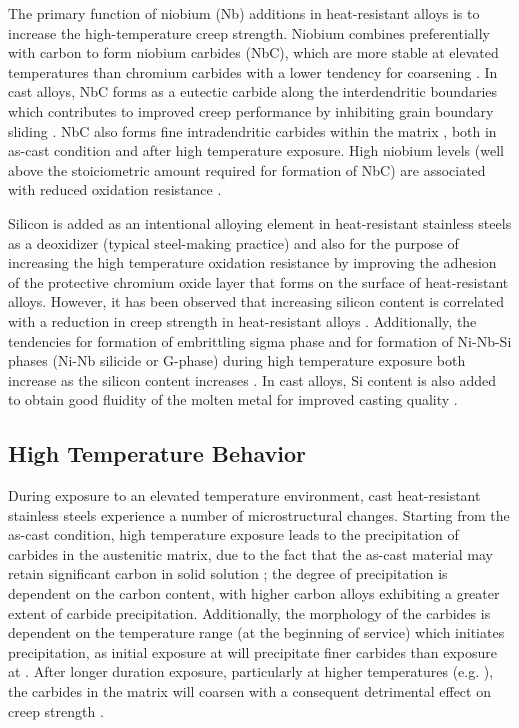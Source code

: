 The primary function of niobium (Nb) additions in heat-resistant alloys is to increase the high-temperature creep strength. Niobium combines preferentially with carbon to form niobium carbides (NbC), which are more stable at elevated temperatures than chromium carbides with a lower tendency for coarsening \cite{keown_niobium_1981}. In cast alloys, NbC forms as a eutectic carbide along the interdendritic boundaries \cite{davis_metallurgy_1994} which contributes to improved creep performance by inhibiting grain boundary sliding \cite{de_almeida_soares_niobium_1992-1}. NbC also forms fine intradendritic carbides within the matrix \cite{chen_characterisation_2004}, both in as-cast condition and after high temperature exposure. High niobium levels (well above the stoiciometric amount required for formation of NbC) are associated with reduced oxidation resistance \cite{collins_effect_1980}.

Silicon is added as an intentional alloying element in heat-resistant stainless steels as a deoxidizer (typical steel-making practice) and also for the purpose of increasing the high temperature oxidation resistance \cite{kane_evolution_1991} by improving the adhesion of the protective chromium oxide layer that forms on the surface of heat-resistant alloys. However, it has been observed that increasing silicon content is correlated with a reduction in creep strength in heat-resistant alloys \cite{avery_cast_1969}. Additionally, the tendencies for formation of embrittling sigma phase and for formation of Ni-Nb-Si phases (Ni-Nb silicide or G-phase) during high temperature exposure both increase as the silicon content increases \cite{pedro_ibanez_effects_1993,davis_metallurgy_1994}. In cast alloys, Si content is also added to obtain good fluidity of the molten metal for improved casting quality \cite{blair_cast_stainless_1990}.

\subsection{High Temperature Behavior}
During exposure to an elevated temperature environment, cast heat-resistant stainless steels experience a number of microstructural changes. Starting from the as-cast condition, high temperature exposure leads to the precipitation of carbides in the austenitic matrix, due to the fact that the as-cast material may retain significant carbon in solid solution \cite{avery_cast_1969}; the degree of precipitation is dependent on the carbon content, with higher carbon alloys exhibiting a greater extent of carbide precipitation. Additionally, the morphology of the carbides is dependent on the temperature range (at the beginning of service) which initiates precipitation, as initial exposure at  will precipitate finer carbides than exposure at  \cite{avery_cast_1969}. After longer duration exposure, particularly at higher temperatures (e.g. ), the carbides in the matrix will coarsen with a consequent detrimental effect on creep strength \cite{avery_cast_1969}.

